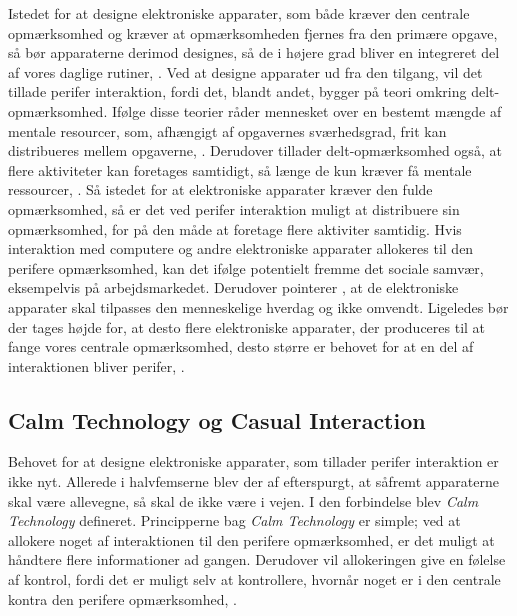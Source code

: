 Istedet for at designe elektroniske apparater, som både kræver den centrale opmærksomhed og kræver at opmærksomheden fjernes fra den primære opgave, så bør apparaterne derimod designes, så de i højere grad bliver en integreret del af vores daglige rutiner, \parencite[s. 239]{PDF:PICharacteristicsAndConsiderations}. Ved at designe apparater ud fra den tilgang, vil det tillade perifer interaktion, fordi det, blandt andet, bygger på teori omkring delt-opmærksomhed. Ifølge disse teorier råder mennesket over en bestemt mængde af mentale resourcer, som, afhængigt af opgavernes sværhedsgrad, frit kan distribueres mellem opgaverne, \parencite[s. 240]{PDF:PICharacteristicsAndConsiderations}. Derudover tillader delt-opmærksomhed også, at flere aktiviteter kan foretages samtidigt, så længe de kun kræver få mentale ressourcer, \parencite[s. 2]{PDF:FacilitatingPIDesignAndEvaluation}. Så istedet for at elektroniske apparater kræver den fulde opmærksomhed, så er det ved perifer interaktion muligt at distribuere sin opmærksomhed, for på den måde at foretage flere aktiviter samtidig. Hvis interaktion med computere og andre elektroniske apparater allokeres til den perifere opmærksomhed, kan det ifølge \textcite[s. 11]{PDF:TheComputerWeiser} potentielt fremme det sociale samvær, eksempelvis på arbejdsmarkedet. Derudover pointerer \textcite[s. 11]{PDF:TheComputerWeiser}, at de elektroniske apparater skal tilpasses den menneskelige hverdag og ikke omvendt. Ligeledes bør der tages højde for, at desto flere elektroniske apparater, der produceres til at fange vores centrale opmærksomhed, desto større er behovet for at en del af interaktionen bliver perifer, \parencite[s. 240]{PDF:PICharacteristicsAndConsiderations}.
\newpage
%
\subsection{Calm Technology og Casual Interaction}
\label{CasualOgCalm}
%
Behovet for at designe elektroniske apparater, som tillader perifer interaktion er ikke nyt. Allerede i halvfemserne blev der af \textcite[s. 3]{PDF:TheComingAgeOfCalmTech} efterspurgt, at såfremt apparaterne skal være allevegne, så skal de ikke være i vejen. I den forbindelse blev \textit{Calm Technology} defineret. Principperne bag \textit{Calm Technology} er simple; ved at allokere noget af interaktionen til den perifere opmærksomhed, er det muligt at håndtere flere informationer ad gangen. Derudover vil allokeringen give en følelse af kontrol, fordi det er muligt selv at kontrollere, hvornår noget er i den centrale kontra den perifere opmærksomhed, \parencite[s. 4]{PDF:TheComingAgeOfCalmTech}. 

